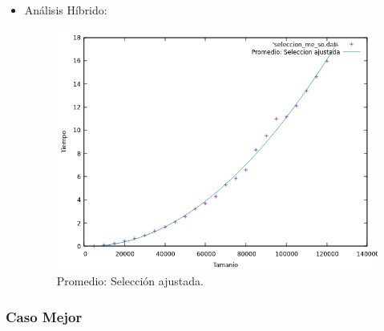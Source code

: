 \documentclass[a4paper,12pt,twoside]{article} %
\begin{document}
\begin{itemize}
		\item Análisis Híbrido:
		
\begin{figure}[h]
  \begin{center}
  
  	\includegraphics[scale=0.8]{seleccion_me_so_a.png}
  	\caption{Promedio: Selección ajustada.}
  	
  \end{center}
\end{figure}
		
	\end{itemize}
	\newpage
	
	\subsubsection{Caso Mejor}
	
\end{document}
